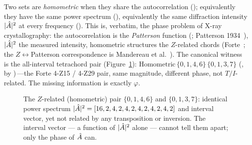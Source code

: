 Two sets are \emph{homometric} when they share the autocorrelation (); equivalently
they have the same power spectrum (), equivalently the same
diffraction intensity $|\hat{A}|^2$ at every frequency (). This
is, verbatim, the phase problem of X-ray crystallography: the autocorrelation is the
\emph{Patterson} function (; Patterson 1934~\cite{Patterson}), $|\hat{A}|^2$ the
measured intensity, homometric structures the $Z$-related chords (Forte~\cite{Forte}; the
$Z\leftrightarrow$Patterson correspondence is Mandereau et al.~\cite{MAAA}). The canonical witness
is the all-interval tetrachord pair (Figure~\ref{fig:p1-zpair}):
$\mathrm{Homometric}\,\{0,1,4,6\}\,\{0,1,3,7\}$ (, by
)\,---the Forte 4-Z15 / 4-Z29 pair, same magnitude, different phase,
not $T/I$-related. The missing information is exactly $\varphi$.

\begin{figure}[ht]
\centering
{}
\caption{The $Z$-related (homometric) pair $\{0,1,4,6\}$ and $\{0,1,3,7\}$: identical power
spectrum $|\hat{A}|^2=[16,2,4,2,4,2,4,2,4,2,4,2]$ and interval vector, yet not related by any
transposition or inversion. The interval vector --- a function of $|\hat{A}|^2$ alone --- cannot
tell them apart; only the phase of $\hat{A}$ can.}
\label{fig:p1-zpair}
\end{figure}

